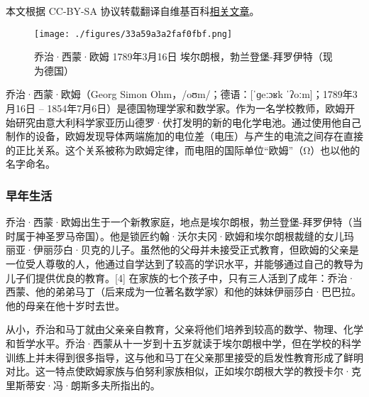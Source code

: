 
本文根据 CC-BY-SA 协议转载翻译自维基百科\href{https://en.wikipedia.org/wiki/Georg_Ohm}{相关文章}。

\begin{figure}[ht]
\centering
\texttt{[image: ./figures/33a59a3a2faf0fbf.png]}
\caption{乔治·西蒙·欧姆  1789年3月16日  埃尔朗根，勃兰登堡-拜罗伊特（现为德国）} \label{fig_GOM_1}
\end{figure}

乔治·西蒙·欧姆（Georg Simon Ohm，/oʊm/；德语：[ˈɡeːɔʁk ˈʔoːm]；1789年3月16日 – 1854年7月6日）是德国物理学家和数学家。作为一名学校教师，欧姆开始研究由意大利科学家亚历山德罗·伏打发明的新的电化学电池。通过使用他自己制作的设备，欧姆发现导体两端施加的电位差（电压）与产生的电流之间存在直接的正比关系。这个关系被称为欧姆定律，而电阻的国际单位“欧姆”（Ω）也以他的名字命名。

\subsubsection{早年生活}  
乔治·西蒙·欧姆出生于一个新教家庭，地点是埃尔朗根，勃兰登堡-拜罗伊特（当时属于神圣罗马帝国）。他是锁匠约翰·沃尔夫冈·欧姆和埃尔朗根裁缝的女儿玛丽亚·伊丽莎白·贝克的儿子。虽然他的父母并未接受正式教育，但欧姆的父亲是一位受人尊敬的人，他通过自学达到了较高的学识水平，并能够通过自己的教导为儿子们提供优良的教育。[4] 在家族的七个孩子中，只有三人活到了成年：乔治·西蒙、他的弟弟马丁（后来成为一位著名数学家）和他的妹妹伊丽莎白·巴巴拉。他的母亲在他十岁时去世。

从小，乔治和马丁就由父亲亲自教育，父亲将他们培养到较高的数学、物理、化学和哲学水平。乔治·西蒙从十一岁到十五岁就读于埃尔朗根中学，但在学校的科学训练上并未得到很多指导，这与他和马丁在父亲那里接受的启发性教育形成了鲜明对比。这一特点使欧姆家族与伯努利家族相似，正如埃尔朗根大学的教授卡尔·克里斯蒂安·冯·朗斯多夫所指出的。
